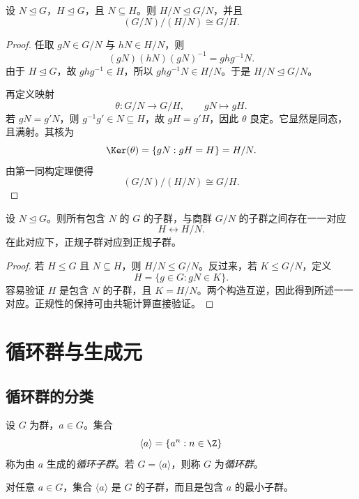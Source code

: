 \begin{theorem}[第三同构定理]
设 $N\trianglelefteq G$，$H\trianglelefteq G$，且 $N\subseteq H$。则 $H/N\trianglelefteq G/N$，并且
\[
 (G/N)/(H/N) \cong G/H.
\]
\end{theorem}

\begin{proof}
任取 $gN\in G/N$ 与 $hN\in H/N$，则
\[
 (gN)(hN)(gN)^{-1}=ghg^{-1}N.
\]
由于 $H\trianglelefteq G$，故 $ghg^{-1}\in H$，所以 $ghg^{-1}N\in H/N$。于是 $H/N\trianglelefteq G/N$。

再定义映射
\[
 \theta:G/N \longrightarrow G/H, \qquad gN \longmapsto gH.
\]
若 $gN=g'N$，则 $g^{-1}g'\in N\subseteq H$，故 $gH=g'H$，因此 $\theta$ 良定。它显然是同态，且满射。其核为
\[
 \Ker(\theta)=\{gN:gH=H\}=H/N.
\]
由第一同构定理便得
\[
 (G/N)/(H/N) \cong G/H.
\]
\end{proof}

\begin{corollary}[对应定理]
设 $N\trianglelefteq G$。则所有包含 $N$ 的 $G$ 的子群，与商群 $G/N$ 的子群之间存在一一对应
\[
 H \longleftrightarrow H/N.
\]
在此对应下，正规子群对应到正规子群。
\end{corollary}

\begin{proof}
若 $H\le G$ 且 $N\subseteq H$，则 $H/N\le G/N$。反过来，若 $K\le G/N$，定义
\[
 H=\{g\in G:gN\in K\}.
\]
容易验证 $H$ 是包含 $N$ 的子群，且 $K=H/N$。两个构造互逆，因此得到所述一一对应。正规性的保持可由共轭计算直接验证。
\end{proof}

\section{循环群与生成元}

\subsection*{循环群的分类}

\begin{definition}
设 $G$ 为群，$a\in G$。集合
\[
 \langle a \rangle=\{a^n:n\in \Z\}
\]
称为由 $a$ 生成的\emph{循环子群}。若 $G=\langle a \rangle$，则称 $G$ 为\emph{循环群}。
\end{definition}

\begin{proposition}
对任意 $a\in G$，集合 $\langle a \rangle$ 是 $G$ 的子群，而且是包含 $a$ 的最小子群。
\end{proposition}


